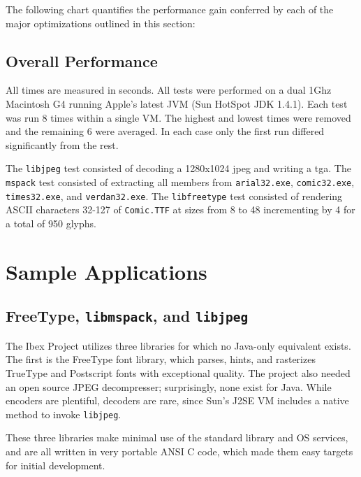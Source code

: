 \documentclass{acmconf}
\begin{document}
The following chart quantifies the performance gain conferred by each
of the major optimizations outlined in this section:




\subsection{Overall Performance}

All times are measured in seconds.  All tests were performed on a dual
1Ghz Macintosh G4 running Apple's latest JVM (Sun HotSpot JDK
1.4.1). Each test was run 8 times within a single VM. The highest and
lowest times were removed and the remaining 6 were averaged.  In each
case only the first run differed significantly from the rest.

The {\tt libjpeg} test consisted of decoding a 1280x1024 jpeg and
writing a tga.  The {\tt mspack} test consisted of extracting all
members from {\tt arial32.exe}, {\tt comic32.exe}, {\tt times32.exe},
and {\tt verdan32.exe}. The {\tt libfreetype} test consisted of
rendering ASCII characters 32-127 of {\tt Comic.TTF} at sizes from 8
to 48 incrementing by 4 for a total of 950 glyphs.




\section{Sample Applications}

\subsection{FreeType, {\tt libmspack}, and {\tt libjpeg}}

The Ibex Project utilizes three libraries for which no Java-only
equivalent exists.  The first is the FreeType font library, which
parses, hints, and rasterizes TrueType and Postscript fonts with
exceptional quality.  The project also needed an open source JPEG
decompresser; surprisingly, none exist for Java.  While encoders are
plentiful, decoders are rare, since Sun's J2SE VM includes a native
method to invoke {\tt libjpeg}.

These three libraries make minimal use of the standard library and OS
services, and are all written in very portable ANSI C code, which made
them easy targets for initial development.
\end{document}
